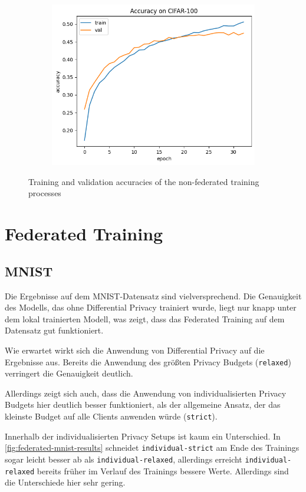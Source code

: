 \begin{figure}
\begin{subfigure}{0.3\textwidth}
		\includegraphics[width=\textwidth]{Bilder/cifar-results-local.png}
		\caption{}
	\end{subfigure}
	\label{fig:local-training-histories}
	\caption{Training and validation accuracies of the non-federated training processes}
\end{figure}

\section{Federated Training}

\subsection{MNIST}

Die Ergebnisse auf dem MNIST-Datensatz sind vielversprechend. Die Genauigkeit des Modells, das ohne Differential Privacy trainiert wurde, liegt nur knapp unter dem lokal trainierten Modell, was zeigt, dass das Federated Training auf dem Datensatz gut funktioniert.

Wie erwartet wirkt sich die Anwendung von Differential Privacy auf die Ergebnisse aus. Bereits die Anwendung des größten Privacy Budgets (\texttt{relaxed}) verringert die Genauigkeit deutlich.

Allerdings zeigt sich auch, dass die Anwendung von individualisierten Privacy Budgets hier deutlich besser funktioniert, als der allgemeine Ansatz, der das kleinste Budget auf alle Clients anwenden würde (\texttt{strict}).

Innerhalb der individualisierten Privacy Setups ist kaum ein Unterschied. In \autoref{fig:federated-mnist-results} schneidet \texttt{individual-strict} am Ende des Trainings sogar leicht besser ab als \texttt{individual-relaxed}, allerdings erreicht \texttt{individual-relaxed} bereits früher im Verlauf des Trainings bessere Werte. Allerdings sind die Unterschiede hier sehr gering.

